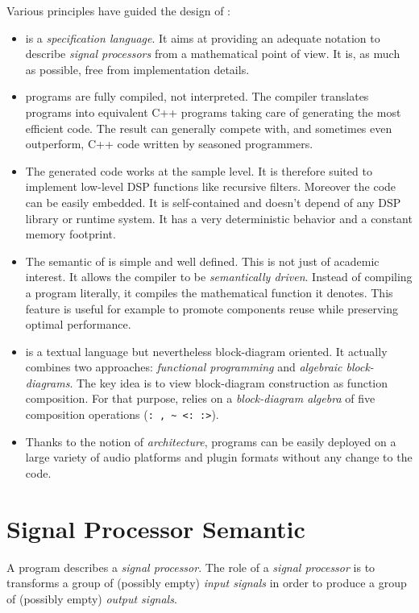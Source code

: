 \documentclass[a4paper]{book}
\begin{document}
Various principles have guided the design of \faust :

\begin{itemize}

\item \faust is a \textit{specification language}. It aims at providing an adequate notation to describe \textit{signal processors} from a mathematical point of view. It is, as much as possible, free from implementation details. 

\item \faust programs are fully compiled, not interpreted. The compiler translates \faust programs into equivalent C++ programs taking care of generating the most efficient code. The result can generally compete with, and sometimes even outperform, C++ code written by seasoned programmers. 

\item The generated code works at the sample level. It is therefore suited to implement low-level DSP functions like recursive filters. Moreover the code can be easily embedded. It is self-contained and doesn't depend of any DSP library or runtime system. It has a very deterministic behavior and a constant memory footprint. 

\item The semantic of \faust is simple and well defined. This is not just of academic interest. It allows the \faust compiler to be \emph{semantically driven}. Instead of compiling a program literally, it compiles the mathematical function it denotes. This feature is useful for example to promote components reuse while preserving optimal performance.  

\item \faust is a textual language but nevertheless block-diagram oriented. It actually combines two approaches: \textit{functional programming} and \textit{algebraic block-diagrams}. The key idea is to view block-diagram construction as function composition. For that purpose, \faust relies on a \emph{block-diagram algebra} of five composition operations (\lstinline': , ~ <: :>').

\item Thanks to the notion of \textit{architecture}, \faust programs can be easily deployed on a large variety of audio platforms and plugin formats without any change to the \faust code.

\end{itemize}

\section{Signal Processor Semantic}
A \faust program describes a \emph{signal processor}. The role of a \textit{signal processor} is to transforms a group  of (possibly empty) \emph{input signals} in order to produce a group of (possibly empty) \emph{output signals}. 
\end{document}
